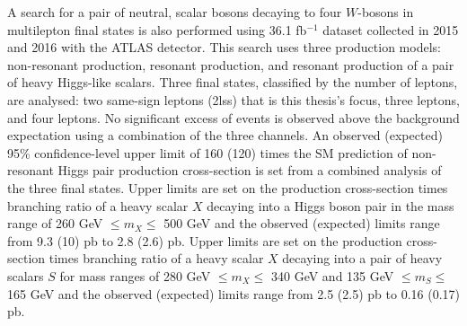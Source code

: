 A search for a pair of neutral, scalar bosons decaying to four $W$-bosons in multilepton final states is also performed using 36.1 fb$^{-1}$ dataset collected in 2015 and 2016 with the ATLAS detector. This search uses three production models: non-resonant production, resonant production, and resonant production of a pair of heavy Higgs-like scalars. Three final states, classified by the number of leptons, are analysed: two same-sign leptons (2lss) that is this thesis's focus, three leptons, and four leptons. No significant excess of events is observed above the background expectation using a combination of the three channels. An observed (expected) 95\% confidence-level upper limit of 160 (120) times the SM prediction of non-resonant Higgs pair production cross-section is set from a combined analysis of the three final states. Upper limits are set on the production cross-section times branching ratio of a heavy scalar $X$
 decaying into a Higgs boson pair in the mass range of 260 GeV $\leq m_X\leq$ 500 GeV and the observed (expected) limits range from 9.3 (10) pb to 2.8 (2.6) pb. Upper limits are set on the production cross-section times branching ratio of a heavy scalar $X$ decaying into a pair of heavy scalars $S$ for mass ranges of 280 GeV $\leq m_X\leq$ 340 GeV and 135 GeV $\leq m_S\leq$ 165 GeV and the observed (expected) limits range from 2.5 (2.5) pb to 0.16 (0.17) pb.

